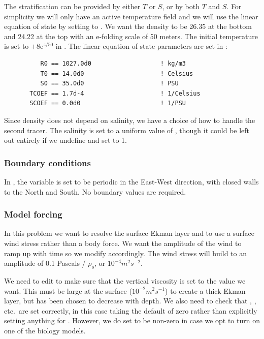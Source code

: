 The stratification can be provided by either $T$ or $S$, or by both
$T$ and $S$.  For
simplicity we will only have an active temperature field and we will
use the linear equation of state by setting  to
. We want the density to be 26.35 at
the bottom and 24.22 at the top with an e-folding scale of 50 meters.
The initial temperature is set to $ + 8\mbox{e}^{z/50}$ in
.  The linear equation of state parameters are set
in :
\begin{verbatim}
          R0 == 1027.0d0                   ! kg/m3
          T0 == 14.0d0                     ! Celsius
          S0 == 35.0d0                     ! PSU
       TCOEF == 1.7d-4                     ! 1/Celsius
       SCOEF == 0.0d0                      ! 1/PSU
\end{verbatim}

Since density does not depend on salinity, we have a choice of how to
handle the second tracer. The salinity is set to a uniform value
of , though it could be left out entirely if we undefine
 and set  to 1.

\subsubsection{Boundary conditions}
In , the variable  is set to be
periodic in the East-West direction, with closed walls to the North
and South. No boundary values are required.

\subsubsection{Model forcing}
In this problem we want to resolve the
surface Ekman layer and to use a surface wind stress rather than a body
force.  We want the amplitude of the wind to ramp up with time so we
modify  accordingly.
The wind stress will build to an amplitude of 0.1 Pascals / $\rho_o$,
or $10^{-4} m^2 s^{-2}$.

We need to edit  to make sure that the
vertical viscosity  is set to the value we want.  This
must be large at the surface ($10^{-2} m^2 s^{-1}$) to create a thick
Ekman layer, but has been chosen to decrease with depth.  We also need
to check that , , etc.\ are
set correctly, in this case taking the default of zero rather than
explicitly setting anything for . However, we do set
 to be non-zero in case we opt to turn on one of
the biology models.

